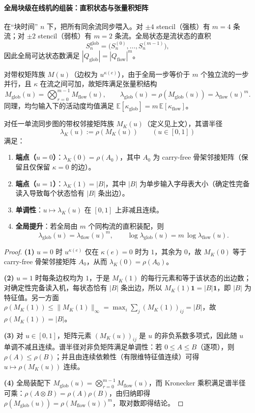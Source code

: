 \paragraph{全局块级在线机的组装：直积状态与张量积矩阵}
在“块时间” $n$ 下，把所有同余流同步喂入。对 $\pm 4$ stencil（强核）有 $m=4$ 条流；对 $\pm 2$ stencil（弱核）有 $m=2$ 条流。全局状态是流状态的直积
\[
S_n^{\mathrm{glob}}=\bigl(S_n^{(0)},\dots,S_n^{(m-1)}\bigr),
\]
因此全局可达状态数满足 $|Q_{\mathrm{glob}}|=|Q_{\mathrm{flow}}|^m$。

对带权矩阵族 $M(u)$（边权为 $u^{\kappa(e)}$），由于全局一步等价于 $m$ 个独立流的一步并行，且 $\kappa$ 在流之间可加，故矩阵满足张量积结构
\[
M_{\mathrm{glob}}(u)=\bigotimes_{r=0}^{m-1} M_{\mathrm{flow}}(u),
\qquad
\lambda_{\mathrm{glob}}(u)=\rho(M_{\mathrm{glob}}(u))=\lambda_{\mathrm{flow}}(u)^m.
\]
同理，均匀输入下的活动度均值满足 $\mathbb{E}[\kappa_{\mathrm{glob}}]=m\,\mathbb{E}[\kappa_{\mathrm{flow}}]$。

\begin{proposition}\label{prop:lambda-endpoints-monotone-uplift}
对任一单流同步图的带权邻接矩阵族 $M_K(u)$（定义见上文），其谱半径
\[
\lambda_K(u):=\rho(M_K(u))\qquad (u\in[0,1])
\]
满足：
\begin{enumerate}
  \item \textbf{端点（$u=0$）}：$\lambda_K(0)=\rho(A_0)$，其中 $A_0$ 为 carry-free 骨架邻接矩阵（保留且仅保留 $\kappa=0$ 的边）。
  \item \textbf{端点（$u=1$）}：$\lambda_K(1)=|B|$，其中 $|B|$ 为单步输入字母表大小（确定性完备读入导致每个状态恰有 $|B|$ 条出边）。
  \item \textbf{单调性}：$u\mapsto \lambda_K(u)$ 在 $[0,1]$ 上非减且连续。
  \item \textbf{全局提升}：若全局由 $m$ 个同构流的直积装配，则
  \[
  \lambda_{\mathrm{glob}}(u)=\lambda_{\mathrm{flow}}(u)^m,
  \qquad
  \log\lambda_{\mathrm{glob}}(u)=m\,\log\lambda_{\mathrm{flow}}(u).
  \]
\end{enumerate}
\end{proposition}

\begin{proof}
\textbf{(1)} $u=0$ 时 $u^{\kappa(e)}$ 仅在 $\kappa(e)=0$ 时为 $1$，其余为 $0$，故 $M_K(0)$ 等于 carry-free 骨架邻接矩阵 $A_0$，从而 $\lambda_K(0)=\rho(A_0)$。

\textbf{(2)} $u=1$ 时每条边权均为 $1$，于是 $M_K(1)$ 的每行元素和等于该状态的出边数；对确定性完备读入机，每状态恰有 $|B|$ 条出边，所以 $M_K(1)\mathbf{1}=|B|\mathbf{1}$，即 $|B|$ 为特征值。另一方面 $\rho(M_K(1))\le \|M_K(1)\|_{\infty}=\max_i\sum_j (M_K(1))_{ij}=|B|$，故 $\rho(M_K(1))=|B|$。

\textbf{(3)} 对 $u\in[0,1]$，矩阵元素 $(M_K(u))_{ij}$ 是 $u$ 的非负系数多项式，因此随 $u$ 单调不减且连续。谱半径对非负矩阵满足单调性：若 $0\le A\le B$（逐项），则 $\rho(A)\le \rho(B)$；并且由连续依赖性（有限维特征值连续）可得 $u\mapsto \rho(M_K(u))$ 连续。

\textbf{(4)} 全局装配下 $M_{\mathrm{glob}}(u)=\bigotimes_{r=0}^{m-1} M_{\mathrm{flow}}(u)$，而 Kronecker 乘积满足谱半径可乘：$\rho(A\otimes B)=\rho(A)\rho(B)$，由归纳即得 $\rho(M_{\mathrm{glob}}(u))=\rho(M_{\mathrm{flow}}(u))^m$，取对数即得结论。
\end{proof}

